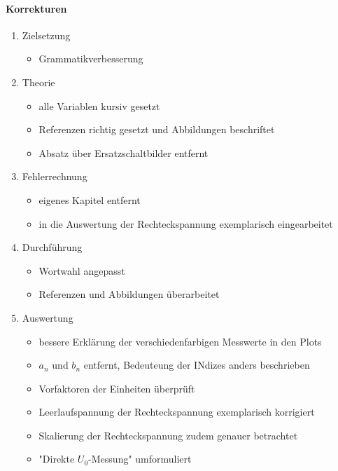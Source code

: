 \paragraph{Korrekturen}
\begin{enumerate}
      \item Zielsetzung
            \begin{itemize}
                  \item Grammatikverbesserung
            \end{itemize}
      \item Theorie
            \begin{itemize}
                  \item alle Variablen kursiv gesetzt
                  \item Referenzen richtig gesetzt und Abbildungen beschriftet
                  \item Absatz über Ersatzschaltbilder entfernt
            \end{itemize}
      \item Fehlerrechnung
            \begin{itemize}
                  \item eigenes Kapitel entfernt
                  \item in die Auswertung der Rechteckspannung exemplarisch eingearbeitet
            \end{itemize}
      \item Durchführung
            \begin{itemize}
                  \item Wortwahl angepasst
                  \item Referenzen und Abbildungen überarbeitet
            \end{itemize}
      \item Auswertung
            \begin{itemize}
                  \item bessere Erklärung der verschiedenfarbigen Messwerte in den Plots
                  \item $a_n$ und $b_n$ entfernt, Bedeuteung der INdizes anders beschrieben
                  \item Vorfaktoren der Einheiten überprüft
                  \item Leerlaufspannung der Rechteckspannung exemplarisch korrigiert
                  \item Skalierung der Rechteckspannung zudem genauer betrachtet
                  \item "Direkte $U_0$-Messung" umformuliert

\end{itemize}
\end{enumerate}
